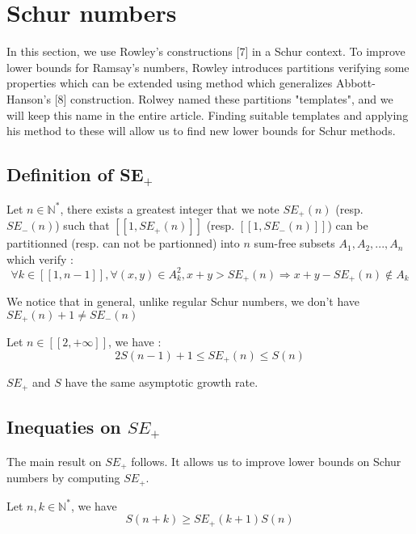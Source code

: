 \section{Schur numbers}

\qquad In this section, we use Rowley's constructions [7] in a Schur context. To improve lower bounds for Ramsay's numbers, Rowley 
introduces partitions verifying some properties which can be extended using method which generalizes Abbott-Hanson's [8] construction. 
Rolwey named these partitions "templates", and we will keep this name in the entire article. Finding suitable templates and applying his 
method to these will allow us to find new lower bounds for Schur methods.

\subsection{Definition of SE\(_+\)}

\begin{definition}
	Let \( n \in \mathbb{N}^*\), there exists a greatest integer that we note \(SE_+(n)\) (resp. \(SE_-(n)\)) such that \( [\![1, SE_+(n)]\!]\) 
	(resp. \( [\![1, SE_-(n)]\!]\)) can be partitionned (resp. can not be partionned) into \(n\) sum-free subsets \(A_1, A_2, ..., A_n\) which verify :
	\[
	\forall k \in [\![1, n-1]\!], \forall (x,y) \in A_k^2, x+y > SE_+(n)
	\Longrightarrow x+y-SE_+(n) \notin A_k
	\]
\end{definition}
We notice that in general, unlike regular Schur numbers, we don't have \(SE_+(n) + 1 \neq SE_-(n)\)

\begin{theorem}
	Let \(n \in [\![2, +\infty]\!]\), we have :
	\[
	2S(n-1)+1 \leqslant SE_+(n) \leqslant S(n)
	\]
\end{theorem}

\begin{remark}
	\(SE_+\) and \(S\) have the same asymptotic growth rate.
\end{remark}


\subsection{Inequaties on \(SE_+\)} 

The main result on \(SE_+\) follows. It allows us to improve lower bounds on Schur numbers by computing \(SE_+\).

\begin{theorem}
	Let \(n, k \in \mathbb{N}^*\), we have \\
	\[ S(n+k) \geqslant SE_+(k+1)S(n) \]
\end{theorem}

